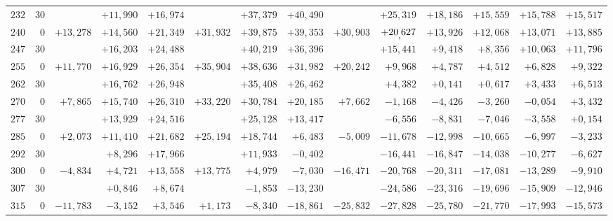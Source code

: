 \begin{landscape}
\begin{longtable}{@{}rr|r|r|r|r|r|r|r|r|r|r|r|r@{}}
\(232\) & \(30\) &  & \(+11{,}990\) & \(+16{,}974\) &  & \(+37{,}379\) & \(+40{,}490\) &  & \(+25{,}319\) & \(+18{,}186\) & \(+15{,}559\) & \(+15{,}788\) & \(+15{,}517\)\\[2pt]
\(240\) & \(0\) & \(+13{,}278\) & \(+14{,}560\) & \(+21{,}349\) & \(+31{,}932\) & \(+39{,}875\) & \(+39{,}353\) & \(+30{,}903\) & \(+20\mathord{\raisebox{-0.8ex}[0pt][0pt]{\ensuremath{,}}}627\) & \(+13{,}926\) & \(+12{,}068\) & \(+13{,}071\) & \(+13{,}885\)\\[4pt]
\(247\) & \(30\) &  & \(+16{,}203\) & \(+24{,}488\) &  & \(+40{,}219\) & \(+36{,}396\) &  & \(+15{,}441\) & \(+9{,}418\) & \(+8{,}356\) & \(+10{,}063\) & \(+11{,}796\)\\
\(255\) & \(0\) & \(+11{,}770\) & \(+16{,}929\) & \(+26{,}354\) & \(+35{,}904\) & \(+38{,}636\) & \(+31{,}982\) & \(+20{,}242\) & \(+9{,}968\) & \(+4{,}787\) & \(+4{,}512\) & \(+6{,}828\) & \(+9{,}322\)\\
\(262\) & \(30\) &  & \(+16{,}762\) & \(+26{,}948\) &  & \(+35{,}408\) & \(+26{,}462\) &  & \(+4{,}382\) & \(+0{,}141\) & \(+0{,}617\) & \(+3{,}433\) & \(+6{,}513\)\\[2pt]
\(270\) & \(0\) & \(+7{,}865\) & \(+15{,}740\) & \(+26{,}310\) & \(+33{,}220\) & \(+30{,}784\) & \(+20{,}185\) & \(+7{,}662\) & \(-1{,}168\) & \(-4{,}426\) & \(-3{,}260\) & \(-0{,}054\) & \(+3{,}432\)\\
\(277\) & \(30\) &  & \(+13{,}929\) & \(+24{,}516\) &  & \(+25{,}128\) & \(+13{,}417\) &  & \(-6{,}556\) & \(-8{,}831\) & \(-7{,}046\) & \(-3{,}558\) & \(+0{,}154\)\\
\(285\) & \(0\) & \(+2{,}073\) & \(+11{,}410\) & \(+21{,}682\) & \(+25{,}194\) & \(+18{,}744\) & \(+6{,}483\) & \(-5{,}009\) & \(-11{,}678\) & \(-12{,}998\) & \(-10{,}665\) & \(-6{,}997\) & \(-3{,}233\)\\
\(292\) & \(30\) &  & \(+8{,}296\) & \(+17{,}966\) &  & \(+11{,}933\) & \(-0{,}402\) &  & \(-16{,}441\) & \(-16{,}847\) & \(-14{,}038\) & \(-10{,}277\) & \(-6{,}627\)\\[2pt]
\(300\) & \(0\) & \(-4{,}834\) & \(+4{,}721\) & \(+13{,}558\) & \(+13{,}775\) & \(+4{,}979\) & \(-7{,}030\) & \(-16{,}471\) & \(-20{,}768\) & \(-20{,}311\) & \(-17{,}081\) & \(-13{,}289\) & \(-9{,}910\)\\
\(307\) & \(30\) &  & \(+0{,}846\) & \(+8{,}674\) &  & \(-1{,}853\) & \(-13{,}230\) &  & \(-24{,}586\) & \(-23{,}316\) & \(-19{,}696\) & \(-15{,}909\) & \(-12{,}946\)\\
\(315\) & \(0\) & \(-11{,}783\) & \(-3{,}152\) & \(+3{,}546\) & \(+1{,}173\) & \(-8{,}340\) & \(-18{,}861\) & \(-25{,}832\) & \(-27{,}828\) & \(-25{,}780\) & \(-21{,}770\) & \(-17{,}993\) & \(-15{,}573\)\\

\end{longtable}
\end{landscape}
